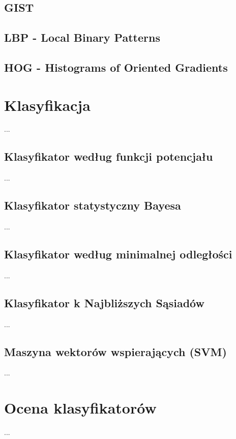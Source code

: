\subsection{GIST}

\subsection{LBP - Local Binary Patterns}

\subsection{HOG - Histograms of Oriented Gradients}


\section{Klasyfikacja}
...


\subsection{Klasyfikator według funkcji potencjału}
...
	
\subsection{Klasyfikator statystyczny Bayesa}
...
	
\subsection{Klasyfikator według minimalnej odległości}
...
	
\subsection{Klasyfikator k Najbliższych Sąsiadów}
...

\subsection{Maszyna wektorów wspierających (SVM)}
...
	
\section{Ocena klasyfikatorów}
...
